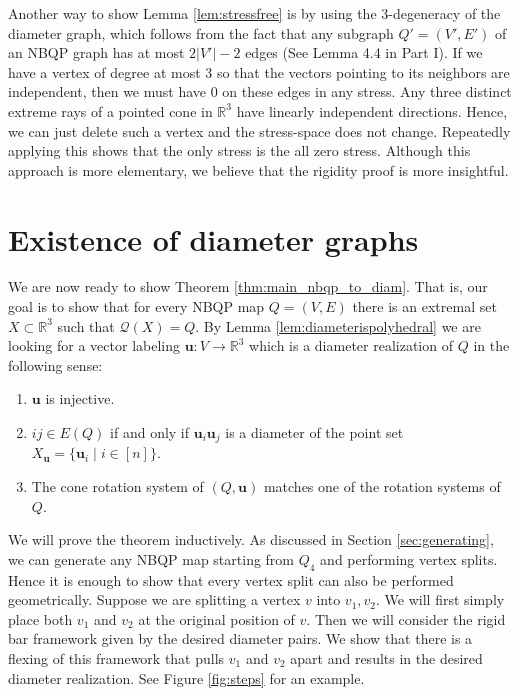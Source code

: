 \documentclass[10pt,a4paper]{article}
\newcounter{example}
\newcommand{\vu}[0]{\mathbf{u}}
\newcommand{\R}[0]{\mathbb{R}}
\newcommand{\qt}{\mathcal{Q}}
\begin{document}
    Another way to show Lemma \ref{lem:stressfree} is by using the 3-degeneracy of the diameter graph, which follows from the fact that any subgraph $Q'=(V',E')$ of an NBQP graph  has at most $2|V'|-2$ edges (See Lemma 4.4 in Part I). If we have a vertex of degree at most 3 so that the vectors pointing to its neighbors are independent, then we must have 0 on these edges in any stress. Any three distinct extreme rays of a pointed cone in $\R^3$ have linearly independent directions. Hence, we can just delete such a vertex and the stress-space does not change. Repeatedly applying this shows that the only stress is the all zero stress. Although this approach is more elementary, we believe that the rigidity proof is more insightful. 



\section{Existence of diameter graphs}\label{sec:qtexsists}
We are now ready to show Theorem \ref{thm:main_nbqp_to_diam}. That is, our goal is to show that for every NBQP map $Q=(V,E)$ there is an extremal set $X\subset \R^3$ such that $\qt(X)=Q$. By Lemma \ref{lem:diameterispolyhedral} we are looking for a vector labeling $\vu:V\rightarrow \R^3$ which is a diameter realization of $Q$ in the following sense:

\begin{enumerate}[label=\alph*)]
    \item $\vu$ is injective.
        \item $ij\in E(Q)$ if and only if $\vu_i\vu_j$ is a diameter of the point set $X_\vu=\{\vu_i\mid i\in [n] \}$.
        \item The cone rotation system of $(Q,\vu)$ matches one of the rotation systems of $Q$.
\end{enumerate}
    
We will prove the theorem inductively. As discussed in Section \ref{sec:generating}, we can generate any NBQP map starting from $Q_4$ and performing vertex splits. Hence it is enough to show that every vertex split can also be performed geometrically. Suppose we are splitting a vertex $v$ into $v_1,v_2$. We will first simply place both $v_1$ and $v_2$ at the original position of $v$. Then we will consider the rigid bar framework given by the desired diameter pairs. We show that there is a flexing of this framework that pulls $v_1$ and $v_2$ apart and results in the desired diameter realization. See Figure \ref{fig:steps} for an example.
\end{document}
